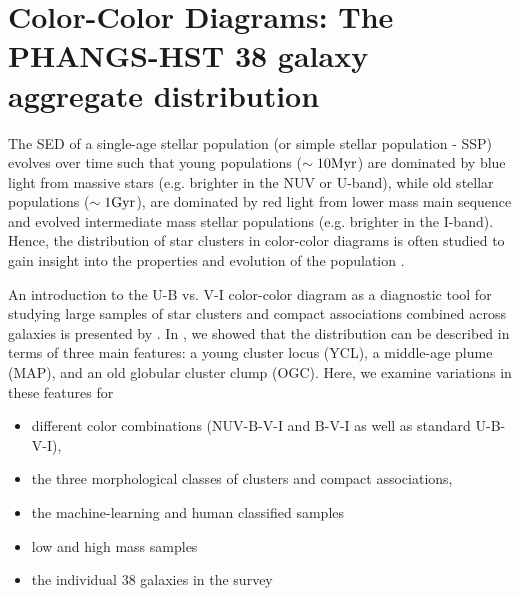 \documentclass[linenumbers]{aastex63}
\begin{document}
{\section{Color-Color Diagrams: The PHANGS-HST 38 galaxy aggregate distribution}\label{sect:color_color}
The SED of a single-age stellar population (or simple stellar population - SSP) evolves over time such that young populations ($\sim 10 {\rm Myr}$) are dominated by blue light from massive stars (e.g. brighter in the NUV or U-band), while old stellar populations ($\sim 1 {\rm Gyr}$), are dominated by red light from lower mass main sequence and evolved intermediate mass stellar populations (e.g. brighter in the I-band).  
Hence, the distribution of star clusters in color-color diagrams is often studied to gain insight into the properties and evolution of the population 
\citep[see][and other earlier papers referred to therein]{lee23ubvi}.


An introduction to the U-B vs. V-I color-color diagram as a diagnostic tool for studying large samples of star clusters and compact associations combined across galaxies is presented by \citet{lee23ubvi}.  In \citet{lee23ubvi}, we showed that the distribution can be described in terms of three main features: a young cluster locus (YCL), a middle-age plume (MAP), and an old globular cluster clump (OGC).   %
Here, we examine variations in these features for 
\begin{itemize}
\item different color combinations (NUV-B-V-I and B-V-I as well as standard U-B-V-I), 
\item the three morphological classes of clusters and compact associations, 
\item the machine-learning and human classified samples
\item low and high mass samples
\item the individual 38 galaxies in the survey
\end{itemize}

}
\end{document}
